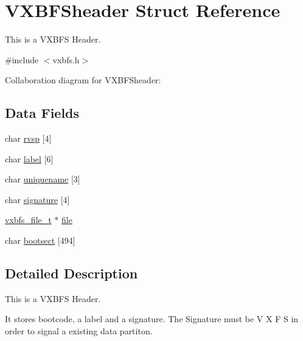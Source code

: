 \hypertarget{a00330}{}\section{V\+X\+B\+F\+Sheader Struct Reference}
\label{a00330}


This is a V\+X\+B\+FS Header.  




{\ttfamily \#include $<$vxbfs.\+h$>$}



Collaboration diagram for V\+X\+B\+F\+Sheader\+:
\subsection*{Data Fields}
\begin{DoxyCompactItemize}
\item 
char \hyperlink{a00330_aad660a962d04482ff03bce38000c1a37_aad660a962d04482ff03bce38000c1a37}{rvsp} \mbox{[}4\mbox{]}
\item 
char \hyperlink{a00330_af3cd6b4358b6ba93a7bd541c09c959c8_af3cd6b4358b6ba93a7bd541c09c959c8}{label} \mbox{[}6\mbox{]}
\item 
char \hyperlink{a00330_af0310ee852d6ec20fe68052fff0d1378_af0310ee852d6ec20fe68052fff0d1378}{uniquename} \mbox{[}3\mbox{]}
\item 
char \hyperlink{a00330_a4c82fb69a08f04d22d832e030cc71577_a4c82fb69a08f04d22d832e030cc71577}{signature} \mbox{[}4\mbox{]}
\item 
\hyperlink{a00200_abb93e2407af0d8fe0f5629ce6456c6f9_abb93e2407af0d8fe0f5629ce6456c6f9}{vxbfs\+\_\+file\+\_\+t} $\ast$ \hyperlink{a00330_a3b903de5c5034494530cdc0c2d4ff9b1_a3b903de5c5034494530cdc0c2d4ff9b1}{file}
\item 
char \hyperlink{a00330_ac10458b5241cce411ef4dd4fff029d0e_ac10458b5241cce411ef4dd4fff029d0e}{bootsect} \mbox{[}494\mbox{]}
\end{DoxyCompactItemize}


\subsection{Detailed Description}
This is a V\+X\+B\+FS Header. 

It stores bootcode, a label and a signature. The Signature must be \textquotesingle{}V\textquotesingle{} \textquotesingle{}X\textquotesingle{} \textquotesingle{}F\textquotesingle{} \textquotesingle{}S\textquotesingle{} in order to signal a existing data partiton. 

